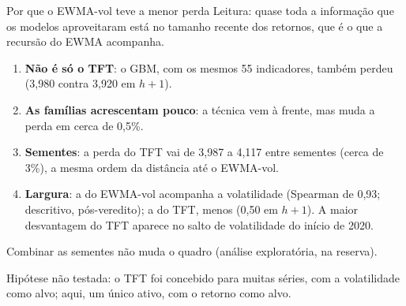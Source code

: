 \documentclass[aspectratio=169,10pt]{beamer}
\newcommand{\hum}{\(h{+}1\)}
\begin{document}
\begin{frame}{Por que o EWMA-vol teve a menor perda}
  \small
  Leitura: quase toda a informação que os modelos aproveitaram está no \alert{tamanho recente dos
  retornos}, que é o que a recursão do EWMA acompanha.
  \begin{enumerate}
    \item \textbf{Não é só o TFT}: o GBM, com os mesmos 55 indicadores, também perdeu
      (3,980 contra 3,920 em \hum).
    \item \textbf{As famílias acrescentam pouco}: a técnica vem à frente, mas muda a perda em
      cerca de 0,5\%.
    \item \textbf{Sementes}: a perda do TFT vai de 3,987 a 4,117 entre sementes
      (cerca de 3\%), a mesma ordem da distância até o EWMA-vol.
    \item \textbf{Largura}: a do EWMA-vol acompanha a volatilidade (Spearman de 0,93; descritivo, pós-veredito);
      a do TFT, menos (0,50 em \hum). A maior desvantagem do TFT aparece no salto de
      volatilidade do início de 2020.
  \end{enumerate}
  Combinar as sementes não muda o quadro (análise exploratória, na reserva).

  \vspace{2pt}
  Hipótese não testada: o TFT foi concebido para muitas séries, com a volatilidade
  como alvo; aqui, um único ativo, com o retorno como alvo.
\end{frame}
\end{document}
